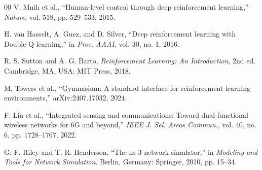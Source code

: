 \documentclass[10pt,conference]{IEEEtran}
\begin{document}
\begin{thebibliography}{00}
V. Mnih et al., ``Human-level control through deep reinforcement learning,''
\emph{Nature}, vol. 518, pp. 529--533, 2015.

H. van Hasselt, A. Guez, and D. Silver, ``Deep reinforcement learning with
Double Q-learning,'' in \emph{Proc. AAAI}, vol. 30, no. 1, 2016.

R. S. Sutton and A. G. Barto, \emph{Reinforcement Learning: An Introduction},
2nd ed. Cambridge, MA, USA: MIT Press, 2018.

M. Towers et al., ``Gymnasium: A standard interface for reinforcement learning
environments,'' arXiv:2407.17032, 2024.

F. Liu et al., ``Integrated sensing and communications: Toward dual-functional
wireless networks for 6G and beyond,'' \emph{IEEE J. Sel. Areas Commun.},
vol. 40, no. 6, pp. 1728--1767, 2022.

G. F. Riley and T. R. Henderson, ``The ns-3 network simulator,'' in
\emph{Modeling and Tools for Network Simulation}. Berlin, Germany: Springer,
2010, pp. 15--34.
\end{thebibliography}
\end{document}
